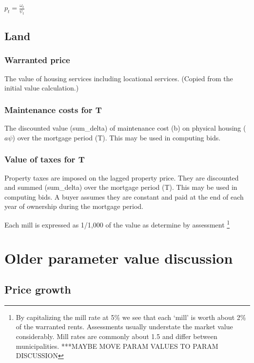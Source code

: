 $p_t= \frac{\omega_t}{\psi_t}$ 

\subsection{Land}
\subsubsection{Warranted price} The value of housing services including locational services. (Copied from the initial value calculation.)

\subsubsection{Maintenance costs for T} The discounted value (sum\_delta) of maintenance cost (b) on  physical housing ($a\psi$) over the mortgage period (T). This may be used in computing bids.

\subsubsection{Value of taxes for T}
Property taxes are imposed on the  lagged property price. They  are discounted and summed (sum\_delta)  over the mortgage period (T). This may be used in computing bids. A buyer assumes they are constant and paid at the end of each year of ownership during the mortgage period.

Each mill is expressed as  1/1,000 of the value as determine by assessment \footnote{By capitalizing the mill rate at 5\%  we see that each `mill' is worth about 2\% of the warranted rents. Assessments usually understate the market value considerably. Mill rates are commonly about 1.5 and differ between municipalities. ***MAYBE MOVE PARAM VALUES TO PARAM DISCUSSION}

\section{Older parameter value discussion}

\subsection{Price growth}


